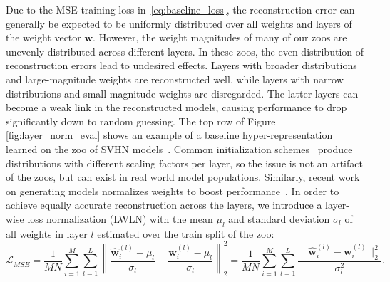 \documentclass{article}
\begin{document}
Due to the MSE training loss in~\eqref{eq:baseline_loss}, the reconstruction error can generally be expected to be uniformly distributed over all weights and layers of the weight vector $\mathbf{w}$.
However, the weight magnitudes of many of our zoos are unevenly distributed across different layers. 
In these zoos, the even distribution of reconstruction errors lead to undesired effects.
Layers with broader distributions and large-magnitude weights are reconstructed well, while layers with narrow distributions and small-magnitude weights are disregarded. The latter layers can become a weak link in the reconstructed models, causing performance to drop significantly down to random guessing. 
The top row of Figure \ref{fig:layer_norm_eval} shows an example of a baseline hyper-representation learned on the zoo of SVHN models~\citep{netzerReadingDigitsNatural2011}.
Common initialization schemes~\citep{heDelvingDeepRectifiers2015,glorotUnderstandingDifﬁcultyTraining2010} produce distributions with different scaling factors per layer, so the issue is not an artifact of the zoos, but can exist in real world model populations. Similarly, recent work on generating models normalizes weights to boost performance~\citep{knyazevParameterPredictionUnseen2021}.
In order to achieve equally accurate reconstruction across the layers, we introduce a layer-wise loss normalization (LWLN) with the mean $\mu_l$ and standard deviation $\sigma_l$ of all weights in layer $l$ estimated over the train split of the zoo:
\begin{equation}
    \label{eq:lwln_loss}
    \mathcal{L}_{\bar{MSE}} = \frac{1}{MN} \sum_{i=1}^{M} \sum_{l=1}^{L} \left\| \frac{\hat{\mathbf{w}}_i^{(l)}-\mu_l}{\sigma_l}-\frac{\mathbf{w}_i^{(l)}-\mu_l}{\sigma_l} \right\|_2^2 = \frac{1}{MN}\sum_{i=1}^M \sum_{l =1}^{L}\frac{\|\hat{\mathbf{w}}_i^{(l)}-\mathbf{w}_i^{(l)} \|_2^2}{\sigma_l^2}. 
\end{equation}


\end{document}

